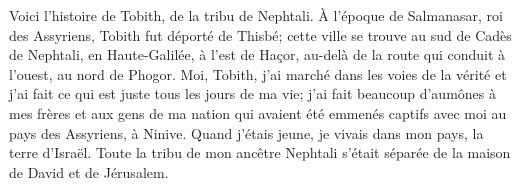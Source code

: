 Voici l’histoire de Tobith, de la tribu de Nephtali.
À l’époque de Salmanasar, roi des Assyriens, Tobith fut déporté de Thisbé;
	cette ville se trouve au sud de Cadès de Nephtali, en Haute-Galilée,
	à l’est de Haçor, au-delà de la route qui conduit à l’ouest, au nord de Phogor.
Moi, Tobith, j’ai marché dans les voies de la vérité
	et j’ai fait ce qui est juste tous les jours de ma vie;
	j’ai fait beaucoup d’aumônes à mes frères et aux gens de ma nation
		qui avaient été emmenés captifs avec moi au pays des Assyriens, à Ninive.
Quand j’étais jeune, je vivais dans mon pays, la terre d’Israël.
	Toute la tribu de mon ancêtre Nephtali
		s’était séparée de la maison de David et de Jérusalem.
